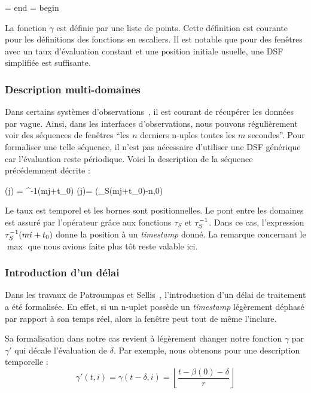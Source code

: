 \DSF{\gamma(t,i) = \displaystyle\sum_{i=0}^{+\infty} u_i \indic_{[u_i, u_{i+1}[}(t)}
	{\beta = \textrm{end}}
	{\alpha = \textrm{begin}}

La fonction $\gamma$ est définie par une liste de points. Cette définition est courante pour les définitions des fonctions en escaliers. Il est notable que pour des fenêtres avec un taux d'évaluation constant et une position initiale usuelle, une DSF simplifiée est suffisante. 
\subsubsection{Description multi-domaines}
Dans certains systèmes d'observations~\cite{Jurdak:sumac}, il est courant de récupérer les données par vague. Ainsi, dans les interfaces d'observations, nous pouvons régulièrement voir des séquences de fenêtres \enquote{les $n$ derniers n-uples toutes les $m$ secondes}. Pour formaliser une telle séquence, il n'est pas nécessaire d'utiliser une DSF générique car l'évaluation reste périodique. Voici la description de la séquence précédemment décrite :

	{\beta(j) = \rtau^{-1}(mj+t_0)}
	{\alpha(j)= \max(\rtau_S(mj+t_0)-n,0)}

Le taux est temporel et les bornes sont positionnelles. Le pont entre les domaines est assuré par l'opérateur grâce aux fonctions $\tau_S$ et $\tau^{-1}_S$. Dans ce cas, l'expression $\tau^{-1}_S(mi+t_0)$ donne la position à un \textit{timestamp} donné. La remarque concernant le $\max$ que nous avions faite plus tôt reste valable ici.

\subsubsection{Introduction d'un délai}
Dans les travaux de Patroumpas et Sellis~\cite{Patroumpas:window}, l'introduction d'un délai de traitement a été formalisée. En effet, si un n-uplet possède un \textit{timestamp} légèrement déphasé par rapport à son temps réel, alors la fenêtre peut tout de même l'inclure.

Sa formalisation dans notre cas revient à légèrement changer notre fonction $\gamma$ par $\gamma'$ qui décale l'évaluation de $\delta$. Par exemple, nous obtenons pour une description temporelle : $$\gamma'(t,i) = \gamma(t-\delta,i) = \left\lfloor\frac{t-\beta(0)-\delta}{r}\right\rfloor$$

